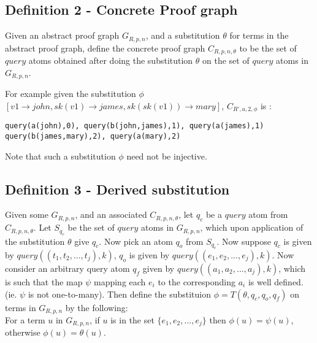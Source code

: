 \documentclass[sigconf]{acmart}
\begin{document}
\subsection{Definition 2 - Concrete Proof graph}

Given an abstract proof graph $G_{R,p,n}$, and a substitution $\theta$ for
terms in the abstract proof graph, define the concrete proof graph
$C_{R,p,n,\theta}$ to be the set of $query$ atoms obtained after doing the
substitution $\theta$ on the set of $query$ atoms in $G_{R,p,n}$.

For example given the substitution $\phi$ $[v1\rightarrow john, sk(v1)
\rightarrow james, sk(sk(v1))\rightarrow mary]$, $C_{R',a,2,\phi}$ is :

\begin{verbatim}
query(a(john),0), query(b(john,james),1), query(a(james),1)
query(b(james,mary),2), query(a(mary),2) \end{verbatim}
Note that such a substitution $\phi$ need not be injective.


\subsection{Definition 3 - Derived substitution}
Given some $G_{R,p,n}$, and an associated $C_{R,p,n,\theta}$, let $q_{c}$ be a $query$ atom from $C_{R,p,n,\theta}$. Let $S_{q_{c}}$ be the set of $query$ atoms in $G_{R,p,n}$, which upon application of the substitution $\theta$ give $q_{c}$. Now pick an atom $q_{o}$ from $S_{q_{c}}$. Now suppose $q_{c}$ is given by $query((t_{1},t_{2},...,t_{j}),k)$, $q_{o}$ is given by $query((e_{1},e_{2},...,e_{j}),k)$. Now consider an arbitrary query atom $q_{f}$ given by $query((a_{1},a_{2},...,a_{j}),k)$, which is such that the map $\psi$ mapping each $e_{i}$ to the corresponding $a_{i}$ is well defined. (ie. $\psi$ is not one-to-many). Then define the substituion $\phi = T(\theta, q_{c},q_{o},q_{f})$ on terms in $G_{R,p,n}$ by the following:\\ For a term $u$ in $G_{R,p,n}$, if $u$ is in the set $\{e_{1},e_{2},...,e_{j}\}$ then $\phi(u) = \psi(u)$, otherwise $\phi(u) = \theta(u)$.
\end{document}
